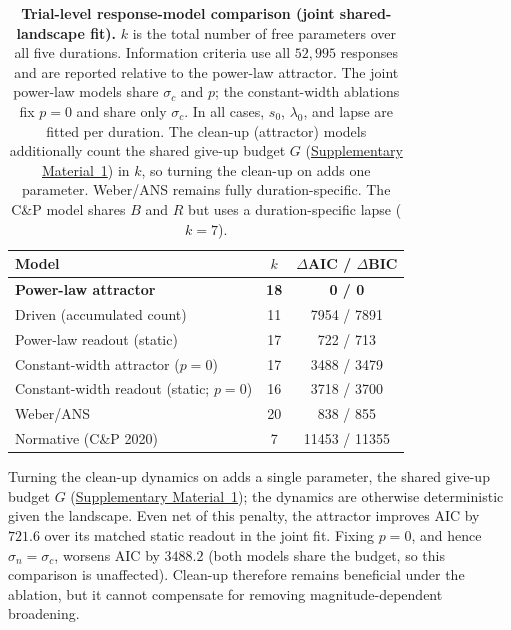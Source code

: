 \documentclass[Afour,sageh,times]{sagej}
\begin{document}
\begin{table}[t]
  \centering
  \caption{\textbf{Trial-level response-model comparison (joint shared-landscape fit).} $k$ is the total number of free parameters over all five durations. Information criteria use all $52{,}995$ responses and are reported relative to the power-law attractor. The joint power-law models share $\sigma_c$ and $p$; the constant-width ablations fix $p=0$ and share only $\sigma_c$. In all cases, $s_0$, $\lambda_0$, and lapse are fitted per duration. The clean-up (attractor) models additionally count the shared give-up budget $G$ (\hyperref[sm:methods]{Supplementary Material~1}) in $k$, so turning the clean-up on adds one parameter. Weber/ANS remains fully duration-specific. The C\&P model shares $B$ and $R$ but uses a duration-specific lapse ($k=7$).}
  \label{tab:ladder}
  \setlength{\tabcolsep}{8pt}
  \begin{tabular}{lcc}
  \hline
  Model & $k$ & $\Delta$AIC / $\Delta$BIC \\
  \hline
  \textbf{Power-law attractor} & \textbf{18} & \textbf{0 / 0} \\
  Driven (accumulated count) & 11 & 7954 / 7891 \\
  Power-law readout (static) & 17 & 722 / 713 \\
  Constant-width attractor ($p=0$) & 17 & 3488 / 3479 \\
  Constant-width readout (static; $p=0$) & 16 & 3718 / 3700 \\
  Weber/ANS & 20 & 838 / 855 \\
  Normative (C\&P 2020) & 7 & 11453 / 11355 \\
  \hline
  \end{tabular}
  \label{tab:model_comparison}
\end{table}


Turning the clean-up dynamics on adds a single parameter, the shared give-up budget $G$ (\hyperref[sm:methods]{Supplementary Material~1}); the dynamics are otherwise deterministic given the landscape. Even net of this penalty, the attractor improves AIC by $721.6$ over its matched static readout in the joint fit. Fixing $p=0$, and hence $\sigma_n=\sigma_c$, worsens AIC by $3488.2$ (both models share the budget, so this comparison is unaffected). Clean-up therefore remains beneficial under the ablation, but it cannot compensate for removing magnitude-dependent broadening.
\end{document}
